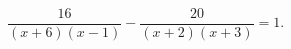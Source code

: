 \begin{ex}[type=equation]
	\begin{condition}
		$\dfrac{16}{(x+ 6)(x - 1)} - \dfrac{20}{(x + 2)(x + 3)} = 1.$
	\end{condition}
\end{ex}